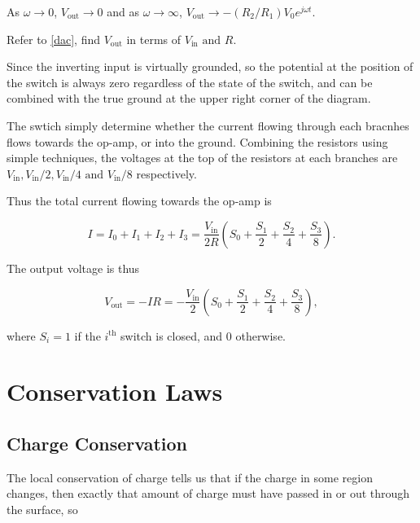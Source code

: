 \documentclass[english,a4paper,12pt]{report}
\begin{document}
As \(\omega \to 0\), \(V_{\text{out} } \to 0\) and as \(\omega \to \infty\), \(V_{\text{out} } \to -(R_2 /R_1 )V_0 e^{j \omega t} \).    


{Refer to \cref{dac}, find \(V_{\text{out} } \) in terms of \(V_{\text{in} }\text { and } R \).  }
{Since the inverting input is virtually grounded, so the potential at the position of the switch is always zero regardless of the state of the switch, and can be combined with the true ground at the upper right corner of the diagram.

The swtich simply determine whether the current flowing through each bracnhes flows towards the op-amp, or into the ground. Combining the resistors using simple techniques, the voltages at the top of the resistors at each branches are \(V_{\text{in} }, V_{\text{in} } /2, V_{\text{in} } /4  \text { and } V_{\text{in} }/8  \) respectively. 

Thus the total current flowing towards the op-amp is

\begin{equation}
    I = I_0 + I_1 + I_2 + I_3 = \frac{V_{\text{in} } }{2R}\left( S_0 + \frac{S_1}{2} + \frac{S_2 }{4} + \frac{S_3}{8} \right). 
\end{equation}

The output voltage is thus 

\begin{equation}
    V_{\text{out} } = - IR =  - \frac{V_{\text{in} } }{2}\left( S_0 + \frac{S_1}{2} + \frac{S_2 }{4} + \frac{S_3}{8} \right),
\end{equation}

where \(S_{i} = 1\) if the \(i^{\text{th}} \) switch is closed, and 0 otherwise.   
} 


\chapter{Conservation Laws}

\section{Charge Conservation}

The local conservation of charge tells us that if the charge in some region changes, then exactly that amount of charge must have passed in or out through the surface, so 
\end{document}

